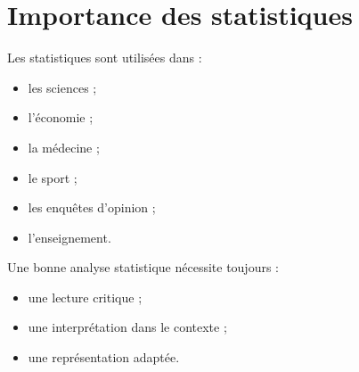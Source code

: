 \section{Importance des statistiques}

\begin{cadresynthese}
Les statistiques sont utilisées dans :
\begin{itemize}
    \item les sciences ;
    \item l’économie ;
    \item la médecine ;
    \item le sport ;
    \item les enquêtes d’opinion ;
    \item l’enseignement.
\end{itemize}

Une bonne analyse statistique nécessite toujours :
\begin{itemize}
    \item une lecture critique ;
    \item une interprétation dans le contexte ;
    \item une représentation adaptée.
\end{itemize}
\end{cadresynthese}